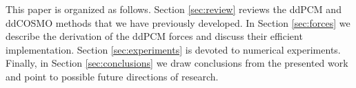 %

This paper is organized as follows. Section \ref{sec:review} reviews the ddPCM and ddCOSMO methods that we have previously developed. In Section \ref{sec:forces} we describe the derivation of the ddPCM forces and discuss their efficient implementation. Section \ref{sec:experiments} is devoted to numerical experiments. Finally, in Section \ref{sec:conclusions} we draw conclusions from the presented work and point to possible future directions of research.